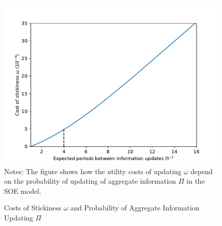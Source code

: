 \documentclass[titlepage]{\econtex}\newcommand{\texname}{cAndCwithStickyE}
\begin{document}
\begin{figure}
\caption{Costs of Stickiness $\omega$ and Probability of Aggregate Information Updating $\Pi$}
\label{costOfStickiness}
{ \includegraphics[width=1.0\textwidth]{./Figures/uCostvsPiInv}}
\footnotesize Notes: The figure shows how the utility costs of updating $\omega$ depend on the probability of updating of aggregate information $\Pi$ in the SOE model.
\end{figure}
\end{document}
